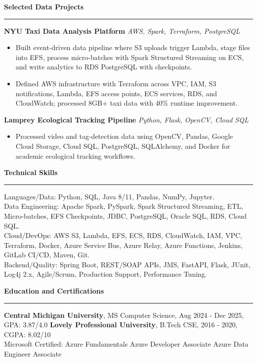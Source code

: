 \documentclass[10pt,letterpaper]{article}
\newcommand{\ressection}[1]{\vspace{3pt}\par\textbf{#1}\par\vspace{1pt}\hrule\vspace{2pt}}
\begin{document}
\ressection{Selected Data Projects}
\textbf{NYU Taxi Data Analysis Platform} \hfill \textit{AWS, Spark, Terraform, PostgreSQL}
\begin{itemize}
  \item Built event-driven data pipeline where S3 uploads trigger Lambda, stage files into EFS, process micro-batches with Spark Structured Streaming on ECS, and write analytics to RDS PostgreSQL with checkpoints.
  \item Defined AWS infrastructure with Terraform across VPC, IAM, S3 notifications, Lambda, EFS access points, ECS services, RDS, and CloudWatch; processed 8GB+ taxi data with 40\% runtime improvement.
\end{itemize}
\textbf{Lamprey Ecological Tracking Pipeline} \hfill \textit{Python, Flask, OpenCV, Cloud SQL}
\begin{itemize}
  \item Processed video and tag-detection data using OpenCV, Pandas, Google Cloud Storage, Cloud SQL, PostgreSQL, SQLAlchemy, and Docker for academic ecological tracking workflows.
\end{itemize}

\ressection{Technical Skills}
Languages/Data: Python, SQL, Java 8/11, Pandas, NumPy, Jupyter.\\
Data Engineering: Apache Spark, PySpark, Spark Structured Streaming, ETL, Micro-batches, EFS Checkpoints, JDBC, PostgreSQL, Oracle SQL, RDS, Cloud SQL.\\
Cloud/DevOps: AWS S3, Lambda, EFS, ECS, RDS, CloudWatch, IAM, VPC, Terraform, Docker, Azure Service Bus, Azure Relay, Azure Functions, Jenkins, GitLab CI/CD, Maven, Git.\\
Backend/Quality: Spring Boot, REST/SOAP APIs, JMS, FastAPI, Flask, JUnit, Log4j 2.x, Agile/Scrum, Production Support, Performance Tuning.

\ressection{Education and Certifications}
\textbf{Central Michigan University}, MS Computer Science, Aug 2024 - Dec 2025, GPA: 3.87/4.0 \textbar{} \textbf{Lovely Professional University}, B.Tech CSE, 2016 - 2020, CGPA: 8.02/10\\
Microsoft Certified: Azure Fundamentals \textbar{} Azure Developer Associate \textbar{} Azure Data Engineer Associate
\end{document}
